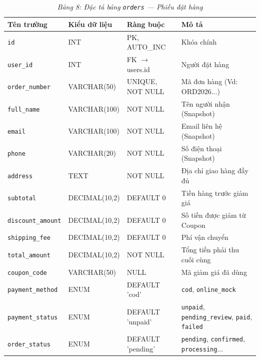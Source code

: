 \documentclass[11pt, a4paper]{article}
\begin{document}
\begin{table}[H]
    \centering
    \caption{\textit{Bảng 8: Đặc tả bảng \texttt{orders} --- Phiếu đặt hàng}}
    \vspace{0.2cm}
    \begin{tabularx}{\linewidth}{|>{\raggedright\arraybackslash}p{3.5cm}|l|l|Y|}
        \hline
        \textbf{Tên trường} & \textbf{Kiểu dữ liệu} & \textbf{Ràng buộc} & \textbf{Mô tả} \\ \hline
        \texttt{id} & INT & PK, AUTO\_INC & Khóa chính \\ \hline
        \texttt{user\_id} & INT & FK $\rightarrow$ users.id & Người đặt hàng \\ \hline
        \texttt{order\_number} & VARCHAR(50) & UNIQUE, NOT NULL & Mã đơn hàng (Vd: ORD2026...) \\ \hline
        \texttt{full\_name} & VARCHAR(100) & NOT NULL & Tên người nhận (Snapshot) \\ \hline
        \texttt{email} & VARCHAR(100) & NOT NULL & Email liên hệ (Snapshot) \\ \hline
        \texttt{phone} & VARCHAR(20) & NOT NULL & Số điện thoại (Snapshot) \\ \hline
        \texttt{address} & TEXT & NOT NULL & Địa chỉ giao hàng đầy đủ \\ \hline
        \texttt{subtotal} & DECIMAL(10,2) & DEFAULT 0 & Tiền hàng trước giảm giá \\ \hline
        \texttt{discount\_amount}& DECIMAL(10,2)& DEFAULT 0 & Số tiền được giảm từ Coupon \\ \hline
        \texttt{shipping\_fee} & DECIMAL(10,2) & DEFAULT 0 & Phí vận chuyển \\ \hline
        \texttt{total\_amount} & DECIMAL(10,2) & NOT NULL & Tổng tiền phải thu cuối cùng \\ \hline
        \texttt{coupon\_code} & VARCHAR(50) & NULL & Mã giảm giá đã dùng \\ \hline
        \texttt{payment\_method}& ENUM & DEFAULT 'cod' & \texttt{cod}, \texttt{online\_mock} \\ \hline
        \texttt{payment\_status}& ENUM & DEFAULT 'unpaid' & \texttt{unpaid}, \texttt{pending\_review}, \texttt{paid}, \texttt{failed} \\ \hline
        \texttt{order\_status} & ENUM & DEFAULT 'pending' & \texttt{pending}, \texttt{confirmed}, \texttt{processing}... \\ \hline
    \end{tabularx}
\end{table}
\end{document}
